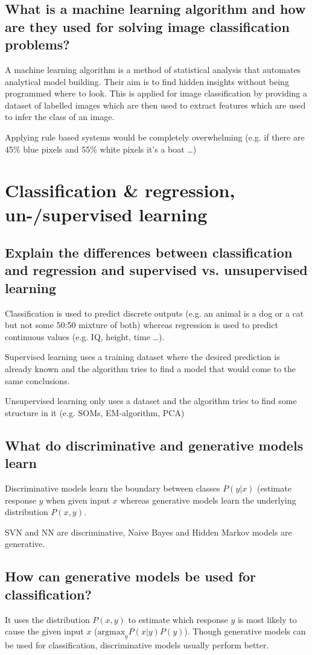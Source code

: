 \subsection{What is a machine learning algorithm and how are they used for solving image classification problems?}
A machine learning algorithm is a method of statistical analysis that automates analytical model building. Their aim is to find hidden insights without being programmed where to look. 
This is applied for image classification by providing a dataset of labelled images which are then used to extract features which are used to infer the class of an image. 

Applying rule based systems would be completely overwhelming (e.g. if there are 45\% blue pixels and 55\% white pixels it's a boat \ldots)
%
\section[Class. \& Regression, (un)supervised learning]{Classification \& regression, un-/supervised learning}
\subsection{Explain the differences between classification and regression and supervised vs. unsupervised learning}
Classification is used to predict discrete outputs (e.g. an animal is a dog or a cat but not some 50:50 mixture of both) whereas regression is used to predict continuous values (e.g. IQ, height, time \ldots).

Supervised learning uses a training dataset where the desired prediction is already known and the algorithm tries to find a model that would come to the same conclusions. 

Unsupervised learning only uses a dataset and the algorithm tries to find some structure in it (e.g. SOMs, EM-algorithm, PCA)
\subsection{What do discriminative and generative models learn }
Discriminative models learn the boundary between classes $P(y|x)$ (estimate response $y$ when given input $x$ whereas generative models learn the underlying distribution $P(x,y)$.

SVN and NN are discriminative, Naive Bayes and Hidden Markov models are generative.
\subsection{How can generative models be used for classification?}
It uses the distribution $P(x,y)$ to estimate which response $y$ is most likely to cause the given input $x$ ($\text{argmax}_y P(x|y)P(y)$). Though generative models can be used for classification, discriminative models usually perform better. 
%
